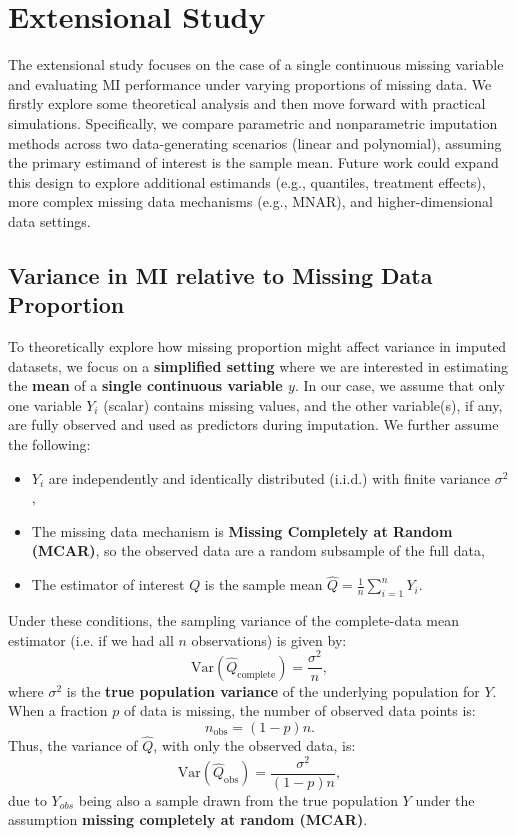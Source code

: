 \documentclass[12pt,oneside]{amsart}
\theoremstyle{definition}
\theoremstyle{remark}
\numberwithin{equation}{section}
\begin{document}
\section{Extensional Study}
The extensional study focuses on the case of a single continuous missing variable and evaluating MI performance under varying proportions of missing data. We firstly explore some theoretical analysis and then move forward with practical simulations. Specifically, we compare parametric and nonparametric imputation methods across two data-generating scenarios (linear and polynomial), assuming the primary estimand of interest is the sample mean. Future work could expand this design to explore additional estimands (e.g., quantiles, treatment effects), more complex missing data mechanisms (e.g., MNAR), and higher-dimensional data settings.

\subsection{Variance in MI relative to Missing Data Proportion}
To theoretically explore how missing proportion might affect variance in imputed datasets, we focus on a \textbf{simplified setting} where we are interested in estimating the \textbf{mean} of a \textbf{single continuous variable $y$}. In our case, we assume that only one variable $Y_i$ (scalar) contains missing values, and the other variable(s), if any, are fully observed and used as predictors during imputation. We further assume the following:
\begin{itemize}
    \item $Y_i$ are independently and identically distributed (i.i.d.) with finite variance $\sigma^2$,
    \item The missing data mechanism is \textbf{Missing Completely at Random (MCAR)}, so the observed data are a random subsample of the full data,
    \item The estimator of interest $Q$ is the sample mean $\hat{Q} = \frac{1}{n} \sum_{i=1}^n Y_i$.
\end{itemize}
Under these conditions, the sampling variance of the complete-data mean estimator (i.e. if we had all $n$ observations) is given by:
\[
\text{Var}(\hat{Q}_{\text{complete}}) = \frac{\sigma^2}{n},
\]
where $\sigma^2$ is the \textbf{true population variance} of the underlying population for $Y$.
When a fraction $p$ of data is missing, the number of observed data points is:
\[
n_{\text{obs}} = (1 - p)n.
\]
Thus, the variance of $\hat{Q}$, with only the observed data, is:
\[
\text{Var}(\hat{Q}_{\text{obs}}) = \frac{\sigma^2}{(1 - p)n},
\]
due to $Y_{obs}$ being also a sample drawn from the true population $Y$ under the assumption \textbf{missing completely at random (MCAR)}. 
\end{document}
